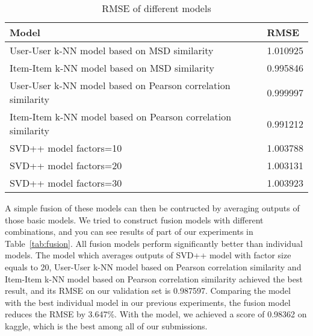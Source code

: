 \documentclass[10pt,conference,compsocconf]{IEEEtran}
\newcommand{\rtab}[1]{Table~\ref{tab:#1}}
\begin{document}
\begin{table}
\renewcommand{\arraystretch}{1.3}
\begin{tabular}{|l|l|}
\hline
\textbf{Model}                                                   & \textbf{RMSE} \\ \hline
User-User k-NN model based on MSD similarity                     & 1.010925     \\ \hline
Item-Item k-NN model based on MSD similarity                     & 0.995846     \\ \hline
User-User k-NN model based on Pearson correlation similarity     & 0.999997     \\ \hline
Item-Item k-NN model based on Pearson correlation similarity     & 0.991212     \\ \hline
SVD++ model factors=10                                           & 1.003788     \\ \hline
SVD++ model factors=20                                           & 1.003131     \\ \hline
SVD++ model factors=30                                           & 1.003923     \\ \hline
\end{tabular}
\caption{RMSE of different models}
\label{tab:models}
\end{table}

A simple fusion of these models can then be contructed by averaging outputs of those basic models. We tried to construct fusion models with different combinations, and you can see results of part of our experiments in \rtab{fusion}. All fusion models perform significantly better than individual models. The model which averages outputs of SVD++ model with factor size equals to 20, User-User k-NN model based on Pearson correlation similarity and Item-Item k-NN model based on Pearson correlation similarity achieved the best result, and its RMSE on our validation set is 0.987597. Comparing the model with the best individual model in our previous experiments, the fusion model reduces the RMSE by 3.647\%. With the model, we achieved a score of 0.98362 on kaggle, which is the best among all of our submissions.
\end{document}
